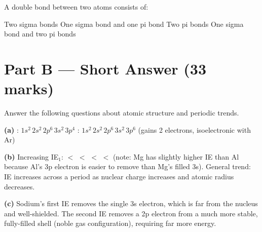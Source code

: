 \documentclass[addpoints]{exam}
\begin{document}
\begin{questions}
\question[1] A double bond between two atoms consists of:
\begin{choices}
    \choice Two sigma bonds
    \correctchoice One sigma bond and one pi bond
    \choice Two pi bonds
    \choice One sigma bond and two pi bonds
\end{choices}


\section*{Part B --- Short Answer (33 marks)}

\question Answer the following questions about atomic structure and periodic trends.
\begin{solution}[9cm]
\textbf{(a)} : $1s^2\,2s^2\,2p^6\,3s^2\,3p^4$\quad
{}: $1s^2\,2s^2\,2p^6\,3s^2\,3p^6$ (gains 2 electrons, isoelectronic with Ar)

\textbf{(b)} Increasing IE$_1$:  $<$  $<$  $<$  $<$ 
(note: Mg has slightly higher IE than Al because Al's 3p electron is easier to remove than
Mg's filled 3s). General trend: IE increases across a period as nuclear charge increases
and atomic radius decreases.

\textbf{(c)} Sodium's first IE removes the single 3s electron, which is far from the nucleus
and well-shielded. The second IE removes a 2p electron from a much more stable, fully-filled
shell (noble gas configuration), requiring far more energy.
\end{solution}


\end{questions}
\end{document}
